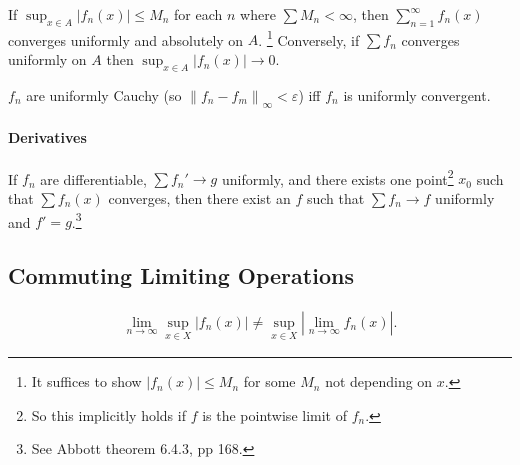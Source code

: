\begin{proposition}

If \(\sup_{x\in A} {\left\lvert {f_n(x)} \right\rvert} \leq M_n\) for
each \(n\) where \(\sum M_n < \infty\), then
\(\sum_{n=1}^\infty f_n(x)\) converges uniformly and absolutely on
\(A\). \footnote{It suffices to show
  \({\left\lvert {f_n(x)} \right\rvert} \leq M_n\) for some \(M_n\) not
  depending on \(x\).} Conversely, if \(\sum f_n\) converges uniformly
on \(A\) then
\(\sup_{x\in A} {\left\lvert {f_n(x)} \right\rvert} \to 0\).

\end{proposition}

\begin{proposition}

\(f_n\) are uniformly Cauchy (so
\({\left\lVert {f_n - f_m} \right\rVert}_\infty < \varepsilon\)) iff
\(f_n\) is uniformly convergent.

\end{proposition}

\hypertarget{derivatives}{%
\paragraph{Derivatives}\label{derivatives}}

\begin{theorem}

If \(f_n\) are differentiable, \(\sum f_n' \to g\) uniformly, and there
exists one point\footnote{So this implicitly holds if \(f\) is the
  pointwise limit of \(f_n\).} \(x_0\) such that \(\sum f_n(x)\)
converges, then there exist an \(f\) such that \(\sum f_n \to f\)
uniformly and \(f' = g\).\footnote{See Abbott theorem 6.4.3, pp 168.}

\end{theorem}

\hypertarget{commuting-limiting-operations}{%
\subsection{Commuting Limiting
Operations}\label{commuting-limiting-operations}}

\begin{proposition}

\begin{align*}  
\lim_{n\to \infty}\sup_{x\in X} {\left\lvert {f_n(x) } \right\rvert} \neq \sup_{x\in X} {\left\lvert {\lim_{n\to\infty} f_n(x) } \right\rvert}
.\end{align*}

\end{proposition}

